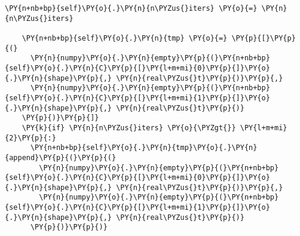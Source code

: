 \begin{Verbatim}[commandchars=\\\{\}]
    \PY{n+nb+bp}{self}\PY{o}{.}\PY{n}{n\PYZus{}iters} \PY{o}{=} \PY{n}{n\PYZus{}iters}
  
    \PY{n+nb+bp}{self}\PY{o}{.}\PY{n}{tmp} \PY{o}{=} \PY{p}{[}\PY{p}{(}
      \PY{n}{numpy}\PY{o}{.}\PY{n}{empty}\PY{p}{(}\PY{n+nb+bp}{self}\PY{o}{.}\PY{n}{C}\PY{p}{[}\PY{l+m+mi}{0}\PY{p}{]}\PY{o}{.}\PY{n}{shape}\PY{p}{,} \PY{n}{real\PYZus{}t}\PY{p}{)}\PY{p}{,}
      \PY{n}{numpy}\PY{o}{.}\PY{n}{empty}\PY{p}{(}\PY{n+nb+bp}{self}\PY{o}{.}\PY{n}{C}\PY{p}{[}\PY{l+m+mi}{1}\PY{p}{]}\PY{o}{.}\PY{n}{shape}\PY{p}{,} \PY{n}{real\PYZus{}t}\PY{p}{)}
    \PY{p}{)}\PY{p}{]}
    \PY{k}{if} \PY{n}{n\PYZus{}iters} \PY{o}{\PYZgt{}} \PY{l+m+mi}{2}\PY{p}{:}
      \PY{n+nb+bp}{self}\PY{o}{.}\PY{n}{tmp}\PY{o}{.}\PY{n}{append}\PY{p}{(}\PY{p}{(}
        \PY{n}{numpy}\PY{o}{.}\PY{n}{empty}\PY{p}{(}\PY{n+nb+bp}{self}\PY{o}{.}\PY{n}{C}\PY{p}{[}\PY{l+m+mi}{0}\PY{p}{]}\PY{o}{.}\PY{n}{shape}\PY{p}{,} \PY{n}{real\PYZus{}t}\PY{p}{)}\PY{p}{,}
        \PY{n}{numpy}\PY{o}{.}\PY{n}{empty}\PY{p}{(}\PY{n+nb+bp}{self}\PY{o}{.}\PY{n}{C}\PY{p}{[}\PY{l+m+mi}{1}\PY{p}{]}\PY{o}{.}\PY{n}{shape}\PY{p}{,} \PY{n}{real\PYZus{}t}\PY{p}{)}
      \PY{p}{)}\PY{p}{)}


\end{Verbatim}
